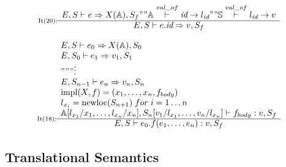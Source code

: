 {\[
\inference[It(20):]{
E,S|-e=>X(\mathbb{A}),S_f "" \mathbb{A} \overset{val\_of}{|-} \textit{id} -> l_{\textit{id}} "" \mathbb{S} \overset{val\_of}{|-} l_{\textit{id}} -> v
}
{E,S|-e.\textit{id}=>v,S_f}
\]

\[
\inference[It(18):]{
E,S|-e_0=>X(\mathbb{A}),S_0 \\
E,S_0|-e_1=>v_1,S_1 \\
""" \vdots \\
E,S_{n-1}|-e_n=>v_n,S_n \\
\operatorname{impl}(X,f) = (x_1, \dots, x_n, f_{body}) \\
l_{x_i} = \operatorname{newloc}(S_{n+1}) \; for \; i = 1 \dots n \\
\mathbb{A}[l_{x_1}/x_1, \dots, l_{x_n}/x_n],S_n[v_1/l_{x_1}, \dots, v_n/l_{x_n}]|-f_{body}:v,S_f
}
{E,S|-e_0.f(e_1, \dots, e_n):v,S_f}
\]


%

\mathligsoff

\subsection{Translational Semantics}\label{sec:semantic}

}
